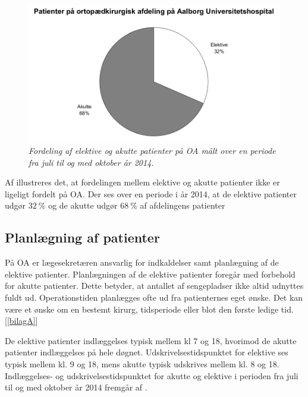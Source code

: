 \begin{figure}[H]
	\flushleft 
	\centering
	\includegraphics[scale=0.55]{figures/elektivvsakut.png}
	\flushleft
	\caption{\textit{Fordeling af elektive og akutte patienter på OA målt over en periode fra juli til og med oktober år 2014.}\cite{REOS}}
	\label{elektivvsakut}
	\end{figure}

\noindent
Af  illustreres det, at fordelingen mellem elektive og akutte patienter ikke er ligeligt fordelt på OA. Der ses over en periode i år 2014, at de elektive patienter udgør $32~\%$ og de akutte udgør $68~\%$ af afdelingens patienter \\

\subsection{Planlægning af patienter} \label{book}
På OA er lægesekretæren ansvarlig for indkaldelser samt planlægning af de elektive patienter. Planlægningen af de elektive patienter foregår med forbehold for akutte patienter. Dette betyder, at antallet af sengepladser ikke altid udnyttes fuldt ud. Operationstiden planlægges ofte ud fra patienternes eget ønske. Det kan være et ønske om en bestemt kirurg, tidsperiode eller blot den første ledige tid.[\ref{bilagA}]

\noindent
De elektive patienter indlæggelses typisk mellem kl 7 og 18, hvorimod de akutte patienter indlæggelses på hele døgnet. Udskrivelsestidspunktet for elektive ses typisk mellem kl. 9 og 18, mens akutte typisk udskrives mellem kl. 8 og 18. Indlæggelses- og udskrivelsestidspunktet for akutte og elektive i perioden fra juli til og med oktober år 2014 fremgår af .\cite{REOS}

